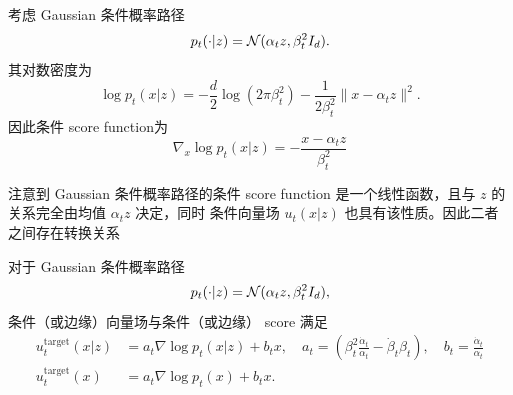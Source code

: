 \begin{example}
考虑 Gaussian 条件概率路径
\begin{equation}
p_t(\cdot|z)=\mathcal{N}(\alpha_t z,\beta_t^2 I_d).
\end{equation}
其对数密度为
\begin{equation}
\log p_t(x|z)
=
-\frac{d}{2}\log(2\pi \beta_t^2)
-\frac{1}{2\beta_t^2}\|x-\alpha_t z\|^2.
\end{equation}
因此条件 score function为
\begin{equation}
\nabla_x \log p_t(x|z)
=
-\frac{x-\alpha_t z}{\beta_t^2}
\end{equation}
\end{example}
注意到 Gaussian 条件概率路径的条件 score function 是一个线性函数，且与 $z$ 的关系完全由均值 $\alpha_t z$ 决定，同时 条件向量场 $u_t(x|z)$ 也具有该性质。因此二者之间存在转换关系

\begin{proposition}
\label{prop:convertion}
  对于 Gaussian 条件概率路径
\begin{equation}
p_t(\cdot|z)=\mathcal{N}(\alpha_t z,\beta_t^2 I_d),
\end{equation}
条件（或边缘）向量场与条件（或边缘） score 满足
\begin{equation}
  \begin{aligned}
    u_t^{\mathrm{target}}(x|z) &= a_t \nabla \log p_t(x|z) + b_t x, \quad a_t = \left( \beta_t^2 \frac{\dot{\alpha}_t}{\alpha_t} - \dot{\beta}_t \beta_t \right), \quad b_t = \frac{\dot{\alpha}_t}{\alpha_t} \\
    u_t^{\mathrm{target}}(x) &= a_t \nabla \log p_t(x) + b_t x.
  \end{aligned}
\end{equation}
\end{proposition}


